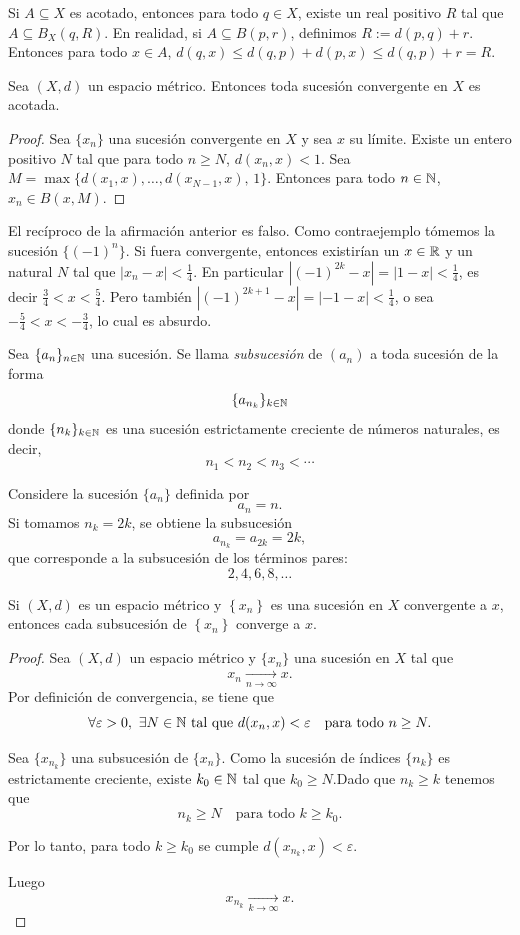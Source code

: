 \begin{remark}
Si $A\subseteq X$ es acotado, entonces para todo $q\in X$, existe un real positivo $R$ tal que $A\subseteq B_X(q,R).$ En realidad, si $A\subseteq B(p, r)$, definimos $R:=d(p,q)+r.$ Entonces para todo $x\in A$, $d(q,x)\leq d(q,p)+d(p,x)\leq d(q,p)+r=R.$
\end{remark}

\begin{teorema}
Sea $(X,d)$ un espacio métrico. Entonces toda sucesión convergente en $X$ es acotada.
\end{teorema}
\begin{proof}
Sea $\{x_n\}$ una sucesión convergente en $X$ y sea $x$ su límite. Existe un entero positivo $N$ tal que para todo $n\geq N$, $d(x_n, x)<1.$ Sea $M=\max\{d(x_1,  x), \dots , d(x_{N-1},  x), \, 1\}.$ Entonces para todo $n\in \mathbb{N}$, $x_n\in B(x, M).$
\end{proof}

El recíproco de la afirmación anterior es falso. Como contraejemplo tómemos la sucesión $\{(-1)^n\}$. Si fuera convergente, entonces existirían un $x\in \mathbb{R}$ y un natural $N$ tal que $|x_n-x|<\frac{1}{4}$. En particular $|(-1)^{2k}-x|=|1-x|<\frac{1}{4}$, es decir $\frac{3}4<x<\frac{5}4$. Pero también $|(-1)^{2k+1}-x|=|-1-x|<\frac{1}{4}$, o sea $-\frac{5}4<x<-\frac{3}4$, lo cual es absurdo.
\begin{definicion}
Sea $\{a_n\}_{n\in\mathbb{N}}$ una sucesión.  
Se llama \emph{subsucesión} de $(a_n)$ a toda sucesión de la forma
\[
\{a_{n_k}\}_{k\in\mathbb{N}}
\]
donde $\{n_k\}_{k\in\mathbb{N}}$ es una sucesión estrictamente creciente de números naturales, es decir,
\[
n_1 < n_2 < n_3 < \cdots
\]
\end{definicion}
\begin{example}
    Considere la sucesión $\{a_n\}$ definida por
\[
a_n = n.
\]
Si tomamos $n_k = 2k$, se obtiene la subsucesión
\[
a_{n_k} = a_{2k} = 2k,
\]
que corresponde a la subsucesión de los términos pares:
\[
2, 4, 6, 8, \dots
\]
\end{example}

\begin{teorema}
    Si $(X,d)$ es un espacio métrico y $\left\{x_n\right\}$ es una sucesión en $X$ convergente a $x$, entonces cada subsucesión de $\left\{x_n\right\}$ converge a $x$.
\end{teorema}
\begin{proof}
    Sea $(X,d)$ un espacio métrico y $\{x_n\}$ una sucesión en $X$ tal que
\[
x_n \xrightarrow[n\to\infty]{} x.
\]
Por definición de convergencia, se tiene que
\[
\forall \varepsilon > 0,\ \exists N \in \mathbb{N} \text{ tal que } d(x_n,x) < \varepsilon
\quad \text{para todo } n \ge N.
\]

Sea $\{x_{n_k}\}$ una subsucesión de $\{x_n\}$.  
Como la sucesión de índices $\{n_k\}$ es estrictamente creciente, existe $k_0 \in \mathbb{N}$ tal que $k_0\ge N$.Dado que $n_k\ge k$ tenemos que
\[
n_k \ge N \quad \text{para todo } k \ge k_0.
\]

Por lo tanto, para todo $k \ge k_0$ se cumple
$d(x_{n_k}, x) < \varepsilon.$


Luego
\[
x_{n_k} \xrightarrow[k\to\infty]{} x.
\]
\end{proof}
